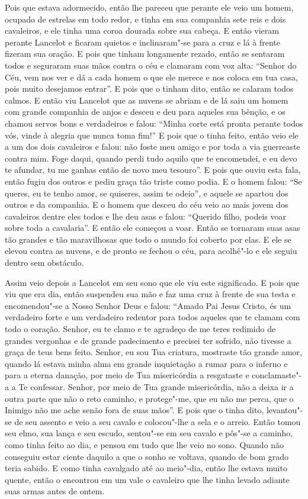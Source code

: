 Pois que estava adormecido, então lhe pareceu que perante ele veio um homem,
ocupado de estrelas em todo redor, e tinha em sua companhia sete reis e dois
cavaleiros, e ele tinha uma coroa dourada sobre sua cabeça. E então vieram
perante Lancelot e ficaram quietos e inclinaram"-se para a cruz e lá à frente
fizeram sua oração. E pois que tinham longamente rezado, então se sentaram
todos e seguraram suas mãos contra o céu e clamaram com voz alta: “Senhor do
Céu, vem nos ver e dá a cada homem o que ele merece e nos coloca em tua casa,
pois muito desejamos entrar”. E pois que o tinham dito, então se calaram todos
calmos. E então viu Lancelot que as nuvens se abriam e de lá saiu um homem com
grande companhia de anjos e desceu e deu para aqueles sua bênção, e os chamou
servos bons e verdadeiros e falou: ``Minha corte está pronta perante todos vós,
vinde à alegria que nunca toma fim!” E pois que o tinha feito, então veio ele
a um dos dois cavaleiros e falou: não foste meu amigo e por toda a via
guerreaste contra mim. Foge daqui, quando perdi tudo aquilo que te encomendei,
e eu devo te afundar, tu me ganhas então de novo meu tesouro”. E pois que ouviu
esta fala, então fugiu dos outros e pediu graça tão triste como podia. E o
homem falou: “Se queres, eu te tenho amor, se quiseres, assim te odeio”, e
aquele se apartou dos outros e da companhia. E o homem que desceu do céu veio
ao mais jovem dos cavaleiros dentre eles todos e lhe deu asas e falou: “Querido
filho, podeis voar sobre toda a cavalaria”. E então ele começou a voar. Então
se tornaram suas asas tão grandes e tão maravilhosas que todo o mundo foi
coberto por elas. E ele se elevou contra as nuvens, e de pronto se fechou o
céu, para acolhê"-lo e ele seguiu dentro sem obstáculo. 

Assim veio depois a Lancelot em seu sono que ele viu este significado. E
pois que viu que era dia, então suspendeu sua mão e faz uma cruz à frente de
sua testa e encomendou"-se a Nosso Senhor Deus e falou: “Amado Pai Jesus Cristo,
és um verdadeiro forte e um verdadeiro redentor para todos aqueles que te
clamam com todo o coração. Senhor, eu te clamo e te agradeço de me teres
redimido de grandes vergonhas e de grande padecimento e precisei ter sofrido,
não tivesse a graça de teus bens feito. Senhor, eu sou Tua criatura, mostraste
tão grande amor, quando lá estava minha alma em grande inquietação a rumar para
o inferno e para a eterna danação, por meio de Tua misericórdia a resgataste e
conclamaste"-a a Te confessar. Senhor, por meio de Tua grande misericórdia, não
a deixa ir a outra parte que não o reto caminho, e protege"-me, que eu não me
perca, que o Inimigo não me ache senão fora de suas mãos”. E pois que o tinha
dito, levantou"-se de seu assento e veio a seu cavalo e colocou"-lhe a sela e o
arreio. Então tomou seu elmo, sua lança e seu escudo, sentou"-se em seu cavalo e
pôs"-se a caminho, como tinha feito ao dia, e pensou em tudo que lhe veio no
sono. Quando não conseguiu estar ciente daquilo a que o sonho se voltava,
quando de bom grado teria sabido. E como tinha cavalgado até ao meio"-dia, então
lhe estava muito quente, então o encontrou em um vale o cavaleiro que lhe tinha
levado adiante suas armas antes de ontem.

